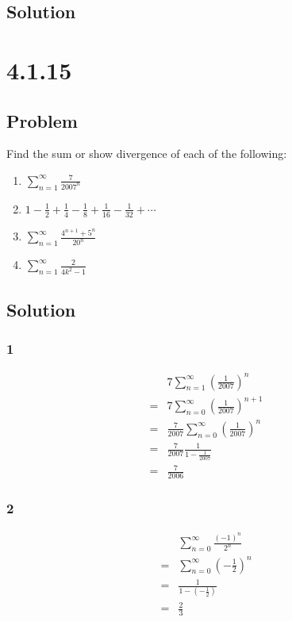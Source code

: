 \documentclass[12pt]{article}
\newcommand{\round}[1]{\left(       #1 \right)      }
\begin{document}
\subsection*{Solution}



\section*{4.1.15}

\subsection*{Problem}
Find the sum or show divergence of each of the following:
\begin{enumerate}
    \item $\sum_{n = 1}^\infty \frac{7}{2007^n}$
    \item $1 - \frac{1}{2} + \frac{1}{4} - \frac{1}{8} + \frac{1}{16} - \frac{1}{32} + \cdots$
    \item $\sum_{n = 1}^\infty \frac{4^{n + 1} + 5^n}{20^n}$
    \item $\sum_{n = 1}^\infty \frac{2}{4k^2 - 1}$
\end{enumerate}

\subsection*{Solution}

\subsubsection*{1}
\begin{align*}
     & 7 \sum_{n=1}^\infty \round{\frac{1}{2007}}^n \\
    =& 7 \sum_{n=0}^\infty \round{\frac{1}{2007}}^{n+1} \\
    =& \frac{7}{2007} \sum_{n=0}^\infty \round{\frac{1}{2007}}^n \\
    =& \frac{7}{2007} \frac{1}{1-\frac{1}{2007}} \\
    =& \frac{7}{2006}
\end{align*}

\subsubsection*{2}
\begin{align*}
     & \sum_{n=0}^\infty \frac{(-1)^n}{2^n} \\
    =& \sum_{n=0}^\infty \round{-\frac{1}{2}}^n \\
    =& \frac{1}{1 - \round{-\frac{1}{2}}} \\
    =& \frac{2}{3}
\end{align*}
\end{document}
